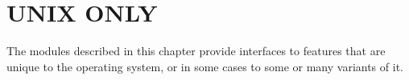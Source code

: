 \chapter{UNIX ONLY}

The modules described in this chapter provide interfaces to features
that are unique to the \UNIX{} operating system, or in some cases to
some or many variants of it.
